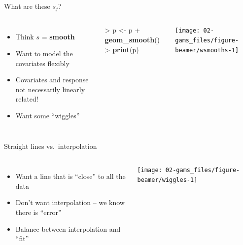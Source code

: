 \documentclass[10pt,ignorenonframetext,compress, aspectratio=169]{beamer}
\newenvironment{Shaded}{\begin{snugshade}}{\end{snugshade}}
\newcommand{\KeywordTok}[1]{\textcolor[rgb]{0.13,0.29,0.53}{\textbf{{#1}}}}
\newcommand{\StringTok}[1]{\textcolor[rgb]{0.31,0.60,0.02}{{#1}}}
\newcommand{\NormalTok}[1]{{#1}}
\providecommand{\tightlist}{%
  \setlength{\itemsep}{0pt}\setlength{\parskip}{0pt}}
\newcommand{\columnsbegin}{\begin{columns}}
\newcommand{\columnsend}{\end{columns}}
\begin{document}
\begin{frame}[fragile]{What are these \(s_j\)?}

\columnsbegin


\begin{itemize}
\tightlist
\item
  Think \(s\) = \textbf{smooth}
\item
  Want to model the covariates flexibly
\item
  Covariates and response not necessarily linearly related!
\item
  Want some ``wiggles''
\end{itemize}


\begin{Shaded}
\begin{Highlighting}[]
\NormalTok{>}\StringTok{ }\NormalTok{p <-}\StringTok{ }\NormalTok{p +}\StringTok{ }\KeywordTok{geom_smooth}\NormalTok{()}
\NormalTok{>}\StringTok{ }\KeywordTok{print}\NormalTok{(p)}
\end{Highlighting}
\end{Shaded}

\begin{center}\texttt{[image: 02-gams\_files/figure-beamer/wsmooths-1]} \end{center}

\columnsend

\end{frame}

\begin{frame}{Straight lines vs.~interpolation}

\columnsbegin
{}

\begin{itemize}
\tightlist
\item
  Want a line that is ``close'' to all the data
\item
  Don't want interpolation -- we know there is ``error''
\item
  Balance between interpolation and ``fit''
\end{itemize}


\begin{center}\texttt{[image: 02-gams\_files/figure-beamer/wiggles-1]} \end{center}

\columnsend

\end{frame}
\end{document}
